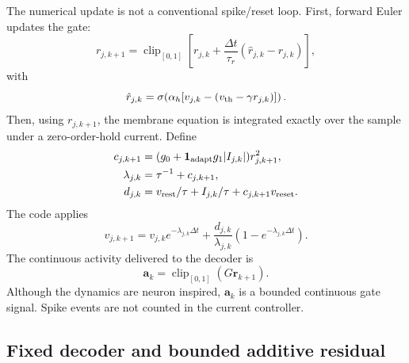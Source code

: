 \documentclass[10pt,twocolumn]{article}
\newcommand{\clip}{\operatorname{clip}}
\begin{document}
The numerical update is not a conventional spike/reset loop. First, forward
Euler updates the gate:
\begin{equation}
    r_{j,k+1}=\clip_{[0,1]}\left[r_{j,k}
    +\frac{\Delta t}{\tau_r}(\hat r_{j,k}-r_{j,k})\right],
\end{equation}
with
\begin{equation}
    \hat r_{j,k}=\sigma\!\left(
    \alpha_h[v_{j,k}-(v_{\rm th}-\gamma r_{j,k})]\right).
\end{equation}
Then, using $r_{j,k+1}$, the membrane equation is integrated exactly over the
sample under a zero-order-hold current. Define
\begin{align}
    c_{j,k+1} &= (g_0+\mathbf{1}_{\rm adapt}g_1|I_{j,k}|)r_{j,k+1}^2,\\
    \lambda_{j,k} &= \tau^{-1}+c_{j,k+1},\\
    d_{j,k} &= v_{\rm rest}/\tau+I_{j,k}/\tau+c_{j,k+1}v_{\rm reset}.
\end{align}
The code applies
\begin{equation}
    v_{j,k+1}=v_{j,k}e^{-\lambda_{j,k}\Delta t}
    +\frac{d_{j,k}}{\lambda_{j,k}}
    \left(1-e^{-\lambda_{j,k}\Delta t}\right).
\end{equation}
The continuous activity delivered to the decoder is
\begin{equation}
    \bm a_k=\clip_{[0,1]}(G\bm r_{k+1}).
\end{equation}
Although the dynamics are neuron inspired, $\bm a_k$ is a bounded continuous
gate signal. Spike events are not counted in the current controller.

\subsection{Fixed decoder and bounded additive residual}
\end{document}
